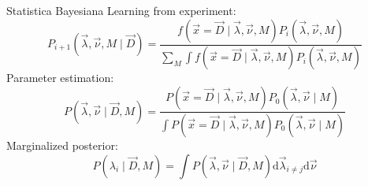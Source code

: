 \documentclass[10pt]{beamer}
\newcommand{\nbb}{\nu\beta\beta}
\begin{document}
\begin{frame}[label=28]{Statistica Bayesiana}
	Learning from experiment:
	\[P_{i+1}(\vec{\lambda},\vec{\nu},M\mid\vec{D})=\frac{f(\vec{x}=\vec{D}\mid\vec{\lambda},\vec{\nu},M)P_i(\vec{\lambda},\vec{\nu},M)}{\sum_M\int f(\vec{x}=\vec{D}\mid\vec{\lambda},\vec{\nu},M)P_i(\vec{\lambda},\vec{\nu},M)}\]
	Parameter estimation:
	\[P(\vec{\lambda},\vec{\nu}\mid\vec{D},M)=\frac{P(\vec{x}=\vec{D}\mid\vec{\lambda},\vec{\nu},M)P_0(\vec{\lambda},\vec{\nu}\mid M)}{\int P(\vec{x}=\vec{D}\mid\vec{\lambda},\vec{\nu},M)P_0(\vec{\lambda},\vec{\nu}\mid M)}\]
	Marginalized posterior:
	\[P(\lambda_i\mid\vec{D},M)=\int P(\vec{\lambda},\vec{\nu}\mid\vec{D},M)\text{d}\vec{\lambda}_{i\neq j}\text{d}\vec{\nu}\]
\end{frame}
\end{document}
